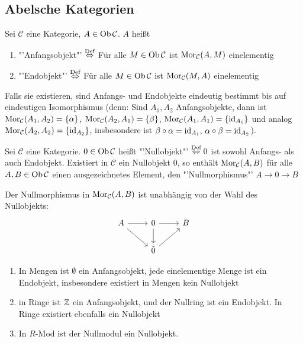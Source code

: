\subsection{Abelsche Kategorien}
\begin{df}
	Sei $\mathcal{C}$ eine Kategorie, $A\in \text{Ob}\,\mathcal{C}$. $A$ heißt
	\begin{enumerate}
		\item[] "'Anfangsobjekt"' $\overset{\text{Def}}{\Leftrightarrow}$ Für alle $M\in \text{Ob}\,\mathcal{C}$ ist $\text{Mor}_{\mathcal{C}}(A,M)$ einelementig
		\item[] "'Endobjekt"' $\overset{\text{Def}}{\Leftrightarrow}$ Für alle $M\in \text{Ob}\,\mathcal{C}$ ist $\text{Mor}_{\mathcal{C}}(M,A)$ einelementig
	\end{enumerate}
\end{df}
\begin{anm}
	Falls sie existieren, sind Anfangs- und Endobjekte eindeutig bestimmt bis auf eindeutigen Isomorphismus (denn: Sind $A_1, A_2$ Anfangsobjekte, dann ist $\text{Mor}_{\mathcal{C}}(A_1, A_2) = \{\alpha\}$, $\text{Mor}_{\mathcal{C}}(A_2, A_1) = \{\beta\}$, $\text{Mor}_{\mathcal{C}}(A_1, A_1) = \{\operatorname{id}_{A_1}\}$ und analog $\text{Mor}_{\mathcal{C}}(A_2, A_2) = \{\operatorname{id}_{A_2}\}$, insbesondere ist $\beta \circ \alpha = \operatorname{id}_{A_1}, \, \alpha \circ \beta = \operatorname{id}_{A_2}$).
\end{anm}
\begin{df}
	Sei $\mathcal{C}$ eine Kategorie. $0\in \text{Ob}\,\mathcal{C}$ heißt "'Nullobjekt"' $\overset{\text{Def}}{\Leftrightarrow} 0$ ist sowohl Anfangs- als auch Endobjekt. Existiert in $\mathcal{C}$ ein Nullobjekt $0$, so enthält $\text{Mor}_{\mathcal{C}}(A,B)$ für alle $A,B \in \text{Ob}\,\mathcal{C}$ einen ausgezeichnetes Element, den "'Nullmorphismus"' $ A \to 0 \to B$
\end{df}
\begin{anm}
	Der Nullmorphismus in $\text{Mor}_{\mathcal{C}}(A,B)$ ist unabhängig von der Wahl des Nullobjekts:
	$$\begin{tikzcd}
	A \arrow{r} \arrow{dr} & 0\arrow{d} \arrow{r} & B \\
	& \tilde{0} \arrow{ur} &
	\end{tikzcd}$$
\end{anm}
\begin{bsp}
	\begin{enumerate}[label=\alph*)]
		\item In Mengen ist $\emptyset$ ein Anfangsobjekt, jede einelementige Menge ist ein Endobjekt, insbesondere existiert in Mengen kein Nullobjekt
		\item in Ringe ist $\mathbb{Z}$ ein Anfangsobjekt, und der Nullring ist ein Endobjekt. In Ringe existiert ebenfalls ein Nullobjekt
		\item In $R$-Mod ist der Nullmodul ein Nullobjekt.
	\end{enumerate}
\end{bsp}
